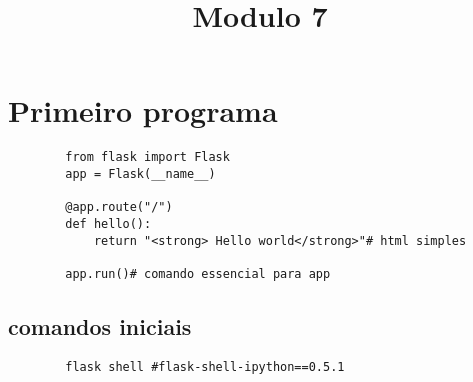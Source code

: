 \documentclass{article}
\date{} %
\title{Modulo 7}
\begin{document}
    \maketitle
    \tableofcontents
    \section{Primeiro programa}
    \begin{lstlisting}
        from flask import Flask
        app = Flask(__name__)

        @app.route("/")
        def hello():
            return "<strong> Hello world</strong>"# html simples

        app.run()# comando essencial para app
    \end{lstlisting}
    
    \subsection[short]{comandos iniciais}
    \begin{lstlisting}
        flask shell #flask-shell-ipython==0.5.1 
    \end{lstlisting}
    

    

    
\end{document}
